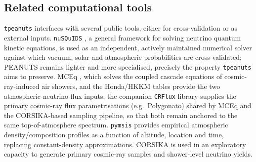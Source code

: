 \subsection{Related computational tools}

\texttt{tpeanuts} interfaces with several public tools, either for cross-validation or as external inputs. \texttt{nuSQuIDS} \parencite{nuSQuIDS}, a general framework for solving neutrino quantum kinetic equations, is used as an independent, actively maintained numerical solver against which vacuum, solar and atmospheric probabilities are cross-validated; PEANUTS remains lighter and more specialised, precisely the property \texttt{tpeanuts} aims to preserve. MCEq \parencite{Fedynitch2015}, which solves the coupled cascade equations of cosmic-ray-induced air showers, and the Honda/HKKM tables \parencite{Honda2007} provide the two atmospheric-neutrino flux inputs; the companion \texttt{CRFlux} library supplies the primary cosmic-ray flux parametrisations (e.g.\ Polygonato) shared by MCEq and the CORSIKA-based sampling pipeline, so that both remain anchored to the same top-of-atmosphere spectrum. \texttt{pymsis} \parencite{Emmert2021} provides empirical atmospheric density/composition profiles as a function of altitude, location and time, replacing constant-density approximations. CORSIKA \parencite{Heck1998} is used in an exploratory capacity to generate primary cosmic-ray samples and shower-level neutrino yields.
